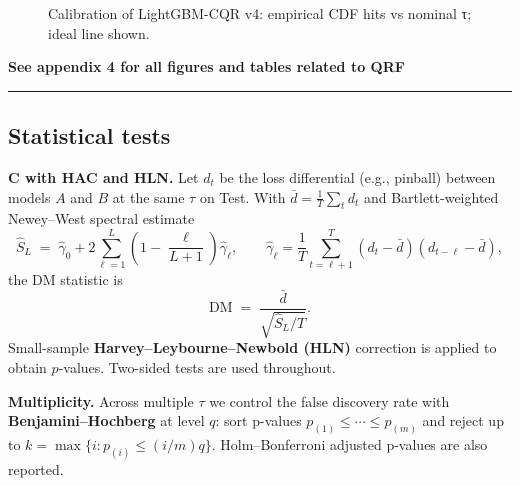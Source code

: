 \documentclass[
  a4paper,
  DIV=11,
  numbers=noendperiod]{scrreprt}
\begin{document}
\begin{figure}


\caption{\label{fig-lgbm-v4-calibration}Calibration of LightGBM-CQR v4:
empirical CDF hits vs nominal τ; ideal line shown.}

\end{figure}%

\textbf{See appendix 4 for all figures and tables related to QRF}

\begin{center}\rule{0.5\linewidth}{0.5pt}\end{center}

\subsection{Statistical tests}\label{app-m4-tests}

\textbf{C with HAC and HLN.} Let \(d_t\) be the loss differential (e.g.,
pinball) between models \(A\) and \(B\) at the same \(\tau\) on Test.
With \(\bar d=\tfrac{1}{T}\sum_t d_t\) and Bartlett-weighted Newey--West
spectral estimate \[
\widehat S_L \;=\; \widehat\gamma_0 + 2\sum_{\ell=1}^{L}\left(1-\frac{\ell}{L+1}\right)\widehat\gamma_\ell,
\qquad
\widehat\gamma_\ell=\frac{1}{T}\sum_{t=\ell+1}^{T}(d_t-\bar d)(d_{t-\ell}-\bar d),
\] the DM statistic is \[
\mathrm{DM} \;=\; \frac{\bar d}{\sqrt{\widehat S_L/T}}.
\] Small-sample \textbf{Harvey--Leybourne--Newbold (HLN)} correction is
applied to obtain \(p\)-values. Two-sided tests are used throughout.

\textbf{Multiplicity.} Across multiple \(\tau\) we control the false
discovery rate with \textbf{Benjamini--Hochberg} at level \(q\): sort
p-values \(p_{(1)}\le\cdots\le p_{(m)}\) and reject up to
\(k=\max\{i: p_{(i)}\le (i/m)q\}\). Holm--Bonferroni adjusted p-values
are also reported.
\end{document}
